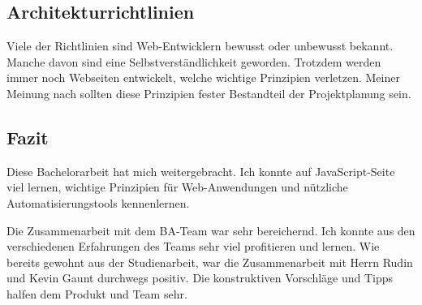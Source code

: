 \subsection*{Architekturrichtlinien}
Viele der Richtlinien sind Web-Entwicklern bewusst oder unbewusst bekannt. Manche davon sind eine Selbstverständlichkeit geworden. Trotzdem werden immer noch Webseiten entwickelt, welche wichtige Prinzipien verletzen.
Meiner Meinung nach sollten diese Prinzipien fester Bestandteil der Projektplanung sein.

\subsection*{Fazit}
Diese Bachelorarbeit hat mich weitergebracht. Ich konnte auf JavaScript-Seite viel lernen, wichtige Prinzipien für Web-Anwendungen und nützliche Automatisierungstools kennenlernen.

Die Zusammenarbeit mit dem BA-Team war sehr bereichernd. Ich konnte aus den verschiedenen Erfahrungen des Teams sehr viel profitieren und lernen. Wie bereits gewohnt aus der Studienarbeit, war die Zusammenarbeit mit Herrn Rudin und Kevin Gaunt durchwegs positiv. Die konstruktiven Vorschläge und Tipps halfen dem Produkt und Team sehr.